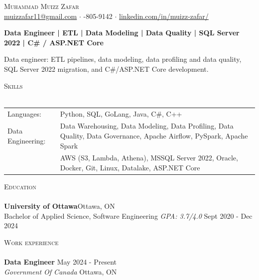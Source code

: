 \documentclass[a4paper]{article}
\newcommand{\lineunder} {
    \vspace*{-8pt} \\
    \hspace*{-18pt} \hrulefill \\
}
\newcommand{\header} [1] {
    {\hspace*{-18pt}\vspace*{6pt} \textsc{#1}}
    \vspace*{-6pt} \lineunder
}
\begin{document}
\vspace*{-40pt}
\vspace*{-10pt}
\begin{center}
	{\Huge \scshape {Muhammad Muizz Zafar}}\\
	\faSend \space \href{mailto:muizzafar11@gmail.com}{muizzafar11@gmail.com} $\cdot$ \faPhoneSquare {}-805-9142 $\cdot$ \faLinkedinSquare \space \href{https://www.linkedin.com/in/muizz-zafar/}{linkedin.com/in/muizz-zafar/}
	\\
\end{center}
\vspace{-5pt}
\begin{center}
\textbf{Data Engineer | ETL | Data Modeling | Data Quality | SQL Server 2022 | C\# / ASP.NET Core}
\end{center}
\begin{center}
Data engineer: ETL pipelines, data modeling, data profiling and data quality, SQL Server 2022 migration, and C\#/ASP.NET Core development.
\end{center}
\header{Skills}
\begin{tabular}{ l l }
	Languages: & Python, SQL, GoLang, Java, C\#, C++ \\
Data Engineering: & Data Warehousing, Data Modeling, Data Profiling, Data Quality, Data Governance, Apache Airflow, PySpark, Apache Spark\\
& AWS (S3, Lambda, Athena), MSSQL Server 2022, Oracle, Docker, Git, Linux, Datalake, ASP.NET Core
\end{tabular}
\header{Education}
\textbf{University of Ottawa}\hfill Ottawa, ON\\
Bachelor of Applied Science, Software Engineering \textit{GPA: 3.7/4.0} \hfill Sept 2020 - Dec 2024\\
\vspace{1mm}
\header{Work experience}
\vspace{1.5mm}
\textbf{Data Engineer} \hfill May 2024 - Present\\
\textit{Government Of Canada} \hfill Ottawa, ON\\
\vspace{-2mm}
\end{document}
